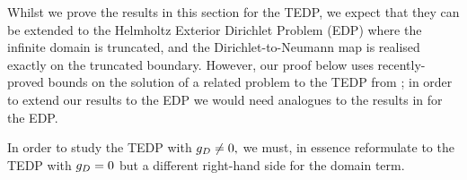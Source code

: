 Whilst we prove the results in this section for the TEDP, we expect that they can be extended to the Helmholtz Exterior Dirichlet Problem (EDP) where the infinite domain is truncated, and the Dirichlet-to-Neumann map is realised exactly on the truncated boundary. However, our proof below uses recently-proved bounds on the solution of a related problem to the TEDP from \cite{ChNiTo:18}; in order to extend our results to the EDP we would need analogues to the results in \cite{ChNiTo:18} for the EDP.



In order to study the TEDP with $g_{D}\neq0,$ we must, in essence reformulate to the TEDP with $g_{D}=0$ but a different right-hand side for the domain term.

